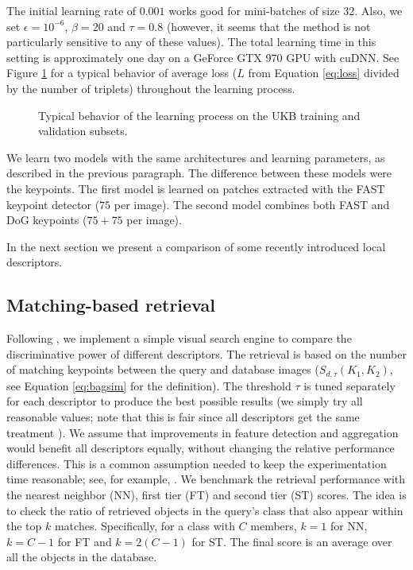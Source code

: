 \documentclass[10pt,conference,a4paper]{IEEEtran}
\begin{document}
			The initial learning rate of $0.001$ works good for mini-batches of size 32.
			Also, we set $\epsilon=10^{-6}$, $\beta=20$ and $\tau=0.8$
			(however, it seems that the method is not particularly sensitive to any of these values).
			The total learning time in this setting is approximately one day on a GeForce GTX 970 GPU with cuDNN.
			See Figure \ref{fig:trnprogress} for a typical behavior of average loss ($L$ from Equation \eqref{eq:loss} divided by the number of triplets) throughout the learning process.
			\begin{figure}
				\centering
				\resizebox{1\columnwidth}{!}
				{
					
				}
				\caption
				{
					Typical behavior of the learning process on the UKB training and validation subsets.
				}
				\label{fig:trnprogress}
			\end{figure}

			We learn two models with the same architectures and learning parameters, as described in the previous paragraph.
			The difference between these models were the keypoints.
			The first model is learned on patches extracted with the FAST keypoint detector ($75$ per image).
			The second model combines both FAST and DoG keypoints ($75+75$ per image).

			In the next section we present a comparison of some recently introduced local descriptors.

		\subsection{Matching-based retrieval}
			Following \cite{rfd}, we implement a simple visual search engine to compare the discriminative power of different descriptors.
			The retrieval  is  based  on  the number of matching keypoints between the query and database images ($S_{d, \tau}(K_1, K_2)$, see Equation \eqref{eq:bagsim} for the definition).
			The threshold $\tau$ is tuned separately for each descriptor to produce the best possible results (we simply try all reasonable values; note that this is fair since all descriptors get the same treatment \cite{rfd}).
			We assume that improvements in feature detection and aggregation would benefit all descriptors equally, without changing the relative performance differences.
			This is a common assumption needed to keep the experimentation time reasonable; see, for example, \cite{kernelconv}.
			We benchmark the retrieval performance with the nearest neighbor (NN), first tier (FT) and second tier (ST) scores.
			The idea is to check the ratio of retrieved objects in the query's class that also appear within the top $k$ matches.
			Specifically, for a class with $C$ members, $k=1$ for NN, $k=C-1$ for FT and $k=2(C-1)$ for ST.
			The final score is an average over all the objects in the database.
\end{document}
